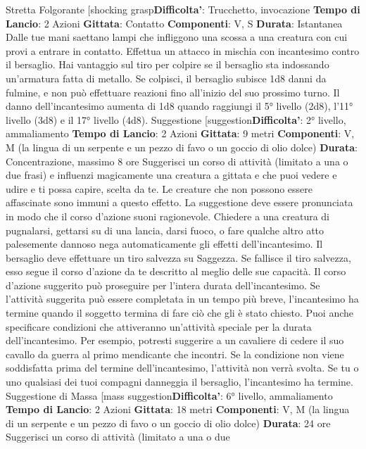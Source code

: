 \begin{multicols}{2}
Stretta Folgorante
[shocking grasp\textbf{Difficolta'}:
Trucchetto, invocazione
\textbf{Tempo di Lancio}: 2 Azioni
\textbf{Gittata}: Contatto
\textbf{Componenti}: V, S
\textbf{Durata}: Istantanea
Dalle tue mani saettano lampi che infliggono una
scossa a una creatura con cui provi a entrare in
contatto. Effettua un attacco in mischia con incantesimo
contro il bersaglio. Hai vantaggio sul tiro per colpire se il
bersaglio sta indossando un’armatura fatta di metallo.
Se colpisci, il bersaglio subisce 1d8 danni da fulmine, e
non può effettuare reazioni fino all’inizio del suo
prossimo turno.
Il danno dell’incantesimo aumenta di 1d8 quando
raggiungi il 5° livello (2d8), l’11° livello (3d8) e il 17°
livello (4d8).
Suggestione
[suggestion\textbf{Difficolta'}:
2° livello, ammaliamento
\textbf{Tempo di Lancio}: 2 Azioni
\textbf{Gittata}: 9 metri
\textbf{Componenti}: V, M (la lingua di un serpente e un pezzo
di favo o un goccio di olio dolce)
\textbf{Durata}: Concentrazione, massimo 8 ore
Suggerisci un corso di attività (limitato a una o due
frasi) e influenzi magicamente una creatura a gittata e
che puoi vedere e udire e ti possa capire, scelta da te.
Le creature che non possono essere affascinate sono
immuni a questo effetto. La suggestione deve essere
pronunciata in modo che il corso d’azione suoni
ragionevole. Chiedere a una creatura di pugnalarsi,
gettarsi su di una lancia, darsi fuoco, o fare qualche
altro atto palesemente dannoso nega automaticamente
gli effetti dell’incantesimo.
Il bersaglio deve effettuare un tiro salvezza su
Saggezza. Se fallisce il tiro salvezza, esso segue il
corso d’azione da te descritto al meglio delle sue
capacità. Il corso d’azione suggerito può proseguire per
l’intera durata dell’incantesimo. Se l’attività suggerita
può essere completata in un tempo più breve,
l’incantesimo ha termine quando il soggetto termina di
fare ciò che gli è stato chiesto.
Puoi anche specificare condizioni che attiveranno
un’attività speciale per la durata dell’incantesimo. Per
esempio, potresti suggerire a un cavaliere di cedere il
suo cavallo da guerra al primo mendicante che incontri.
Se la condizione non viene soddisfatta prima del
termine dell’incantesimo, l’attività non verrà svolta.
Se tu o uno qualsiasi dei tuoi compagni danneggia il
bersaglio, l’incantesimo ha termine.
Suggestione di Massa
[mass suggestion\textbf{Difficolta'}:
6° livello, ammaliamento
\textbf{Tempo di Lancio}: 2 Azioni
\textbf{Gittata}: 18 metri
\textbf{Componenti}: V, M (la lingua di un serpente e un pezzo
di favo o un goccio di olio dolce)
\textbf{Durata}: 24 ore
Suggerisci un corso di attività (limitato a una o due

\end{multicols}
